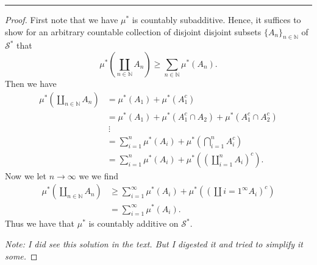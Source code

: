 \documentclass[leqno]{article}
\theoremstyle{nonumberplain}
\newtheorem{proof}{Proof}
\newcommand{\N}{\mathbb{N}}
\begin{document}
\noindent\rule[0.5ex]{\linewidth}{1pt}

\begin{proof}
First note that we have $\mu^*$ is countably subadditive.  Hence, it suffices to show for an arbitrary countable collection of disjoint disjoint subsets $\{A_n\}_{n\in \N}$ of $\mathcal{S}^*$ that
\[
\mu^*\left( \coprod_{n\in \N} A_n \right) \geq \sum_{n\in \N}\mu^* (A_n).
\]
Then we have
\begin{align*}
\mu^*\left( \coprod_{n\in \N} A_n \right) &= \mu^*(A_1)+\mu^*(A_1^c)\\
&= \mu^*(A_1)+\mu^*(A_1^c \cap A_2)+\mu^*(A_1^c\cap A_2^c)\\
&~\vdots\\
&= \sum_{i=1}^n \mu^* (A_i)+\mu^* \left( \bigcap_{i=1}^n A_i^c \right)\\
&= \sum_{i=1}^n \mu^*(A_i) + \mu^*\left(\left( \coprod_{i=1}^n A_i \right)^c \right).
\end{align*}
Now we let $n\to \infty$ we we find
\begin{align*}
\mu^*\left( \coprod_{n\in \N} A_n \right) &\geq \sum_{i=1}^\infty \mu^*(A_i) + \mu^*\left( \left( \coprod{i=1}^\infty A_i\right)^c \right)\\
&= \sum_{i=1}^\infty \mu^*(A_i).
\end{align*}
Thus we have that $\mu^*$ is countably additive on $\mathcal{S}^*$.

\emph{Note: I did see this solution in the text.  But I digested it and tried to simplify it some.}
\end{proof}

\pagebreak
\end{document}
